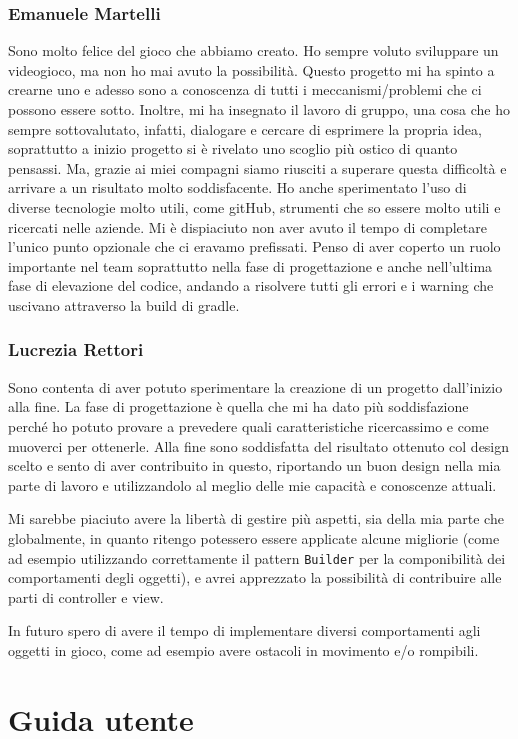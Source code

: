 \documentclass[a4paper,12pt]{report}
\begin{document}
\subsection*{Emanuele Martelli}
Sono molto felice del gioco che abbiamo creato. Ho sempre voluto sviluppare un videogioco, ma non ho mai avuto la possibilità. Questo progetto mi ha spinto a crearne uno e adesso sono a conoscenza di tutti i meccanismi/problemi che ci possono essere sotto. Inoltre, mi ha insegnato il lavoro di gruppo, una cosa che ho sempre sottovalutato, infatti, dialogare e cercare di esprimere la propria idea, soprattutto a inizio progetto si è rivelato uno scoglio più ostico di quanto pensassi. Ma, grazie ai miei compagni siamo riusciti a superare questa difficoltà e arrivare a un risultato molto soddisfacente. Ho anche sperimentato l’uso di diverse tecnologie molto utili, come gitHub, strumenti che so essere molto utili e ricercati nelle aziende.  Mi è dispiaciuto non aver avuto il tempo di completare l’unico punto opzionale che ci eravamo prefissati. Penso di aver coperto un ruolo importante nel team soprattutto nella fase di progettazione e anche nell’ultima fase di elevazione del codice, andando a risolvere tutti gli errori e i warning che uscivano attraverso la build di gradle.
\newpage
\subsection*{Lucrezia Rettori}
Sono contenta di aver potuto sperimentare la creazione di un progetto dall'inizio alla fine. La fase di progettazione è quella che mi ha dato più soddisfazione perché ho potuto provare a prevedere quali caratteristiche ricercassimo e come muoverci per ottenerle. Alla fine sono soddisfatta del risultato ottenuto col design scelto e sento di aver contribuito in questo, riportando un buon design nella mia parte di lavoro e utilizzandolo al meglio delle mie capacità e conoscenze attuali.

Mi sarebbe piaciuto avere la libertà di gestire più aspetti, sia della mia parte che globalmente, in quanto ritengo potessero essere applicate alcune migliorie (come ad esempio utilizzando correttamente il pattern \texttt{Builder} per la componibilità dei comportamenti degli oggetti), e avrei apprezzato la possibilità di contribuire alle parti di controller e view.

In futuro spero di avere il tempo di implementare diversi comportamenti agli oggetti in gioco, come ad esempio avere ostacoli in movimento e/o rompibili.
\appendix
\chapter{Guida utente}
\end{document}
